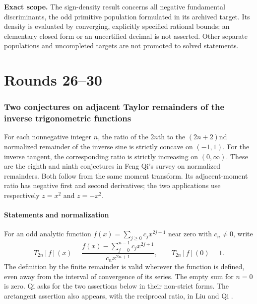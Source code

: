 \documentclass[11pt,a4paper]{article}
\numberwithin{equation}{section}
\theoremstyle{definition}
\theoremstyle{remark}
\newenvironment{sectionabstract}{\par\smallskip\begingroup\small\noindent}{\par\endgroup\medskip}
\begin{document}
\noindent\textbf{Exact scope.} The sign-density result concerns all negative
fundamental discriminants, the odd primitive population formulated in its
archived target. Its density is evaluated by converging, explicitly specified
rational bounds; an elementary closed form or an uncertified decimal is not
asserted. Other separate populations and uncompleted targets are not promoted
to solved statements.

\clearpage
\tableofcontents
\clearpage
{}
\part{Rounds 26--30}

\begingroup

\section{\texorpdfstring{Two conjectures on adjacent Taylor remainders of the inverse trigonometric functions}{Two conjectures on adjacent Taylor remainders of the inverse trigonometric functions}}\label{section:r26meiji}
\par\medskip


\begin{sectionabstract}
For each nonnegative integer $n$, the ratio of the $2n$th to the
$(2n+2)$nd normalized remainder of the inverse sine is strictly
concave on $(-1,1)$. For the inverse tangent, the corresponding
ratio is strictly increasing on $(0,\infty)$. These are the eighth and
ninth conjectures in Feng Qi's survey on normalized remainders. Both
follow from the same moment transform. Its adjacent-moment ratio
has negative first and second derivatives; the two applications use
respectively $z=x^2$ and $z=-x^2$.
\end{sectionabstract}

\subsection{Statements and normalization}
For an odd analytic function $f(x)=\sum_{j\ge0}c_jx^{2j+1}$
near zero with $c_n\ne0$, write
\[
 T_{2n}[f](x)=\frac{f(x)-\sum_{j=0}^{n-1}c_jx^{2j+1}}
                       {c_nx^{2n+1}},\qquad T_{2n}[f](0)=1.
\]
The definition by the finite remainder is valid wherever the function is
defined, even away from the interval of convergence of its series.
The empty sum for $n=0$ is zero. Qi \cite[Secs.~12.7.1.8--9]{r26meiji:Qi}
asks for the two assertions below in their non-strict forms.
The arctangent assertion also appears, with the reciprocal ratio, in
Liu and Qi \cite[Remark~5.1]{r26meiji:LQ}.
\end{document}
